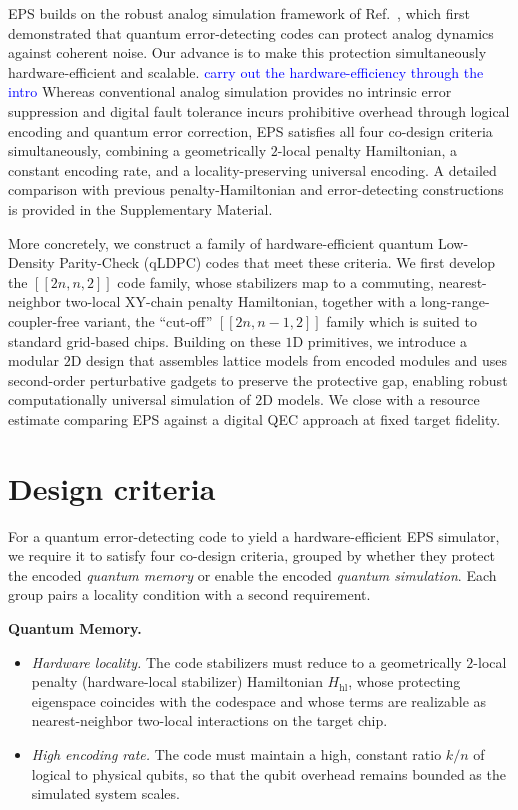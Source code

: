 \documentclass[%
10pt,tightenlines,
superscriptaddress,
 amsmath,amssymb,
 aps,
pra,
]{revtex4-2}
\newcommand{\sy}[1]{\textcolor{blue}{#1}}
\begin{document}
EPS builds on the robust analog simulation framework of Ref.~\cite{cao2024robust}, which first demonstrated that quantum error-detecting codes can protect analog dynamics against coherent noise. Our advance is to make this protection simultaneously hardware-efficient and scalable. \sy{carry out the hardware-efficiency through the intro} Whereas conventional analog simulation provides no intrinsic error suppression and digital fault tolerance incurs prohibitive overhead through logical encoding and quantum error correction, EPS satisfies all four co-design criteria simultaneously, combining a geometrically $2$-local penalty Hamiltonian, a constant encoding rate, and a locality-preserving universal encoding. A detailed comparison with previous penalty-Hamiltonian and error-detecting constructions is provided in the Supplementary Material.

More concretely, we construct a family of hardware-efficient quantum Low-Density Parity-Check (qLDPC) codes that meet these criteria. We first develop the $[[2n,n,2]]$ code family, whose stabilizers map to a commuting, nearest-neighbor two-local XY-chain penalty Hamiltonian, together with a long-range-coupler-free variant, the ``cut-off'' $[[2n,n-1,2]]$ family which is suited to standard grid-based chips. Building on these $1$D primitives, we introduce a modular $2$D design that assembles lattice models from encoded modules and uses second-order perturbative gadgets to preserve the protective gap, enabling robust computationally universal simulation of $2$D models. We close with a resource estimate comparing EPS against a digital QEC approach at fixed target fidelity.

\section{Design criteria}\label{sec:criteria}
For a quantum error-detecting code to yield a hardware-efficient EPS simulator, we require it to satisfy four co-design criteria, grouped by whether they protect the encoded \emph{quantum memory} or enable the encoded \emph{quantum simulation}. Each group pairs a locality condition with a second requirement.

\noindent\textbf{Quantum Memory.}
\begin{itemize}
    \item \emph{Hardware locality.} The code stabilizers must reduce to a geometrically $2$-local penalty (hardware-local stabilizer) Hamiltonian $H_{\text{hl}}$, whose protecting eigenspace coincides with the codespace and whose terms are realizable as nearest-neighbor two-local interactions on the target chip.
    \item \emph{High encoding rate.} The code must maintain a high, constant ratio $k/n$ of logical to physical qubits, so that the qubit overhead remains bounded as the simulated system scales.
\end{itemize}
\end{document}

